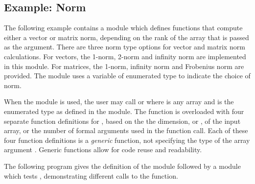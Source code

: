 \subsection{Example: Norm}
The following example contains a module  which defines  
 functions that compute either a vector or matrix norm, depending
on the rank of the array that is passed as the argument.  There are three
norm type options for vector and matrix norm calculations.  For vectors,  
the 1-norm, 2-norm and infinity norm are implemented in this module.  
For matrices, the 1-norm, infinity norm and Frobenius norm are provided.   
The module uses a variable of enumerated type  to indicate the choice
of norm.

When the  module is used, the user may call 
 or  where
 is any array and  is the enumerated type as defined
in the  module.  The  function is overloaded with
four separate function definitions for , based on the
the dimension, or , of the input array, or the number of formal
arguments used in the  function call.  Each of these four function
definitions is a {\em generic} function, not specifying the type of the array
argument .  Generic functions allow for code reuse and readability.

The following program gives the definition of the  module followed
by a module which tests , demonstrating different calls to the 
function.

